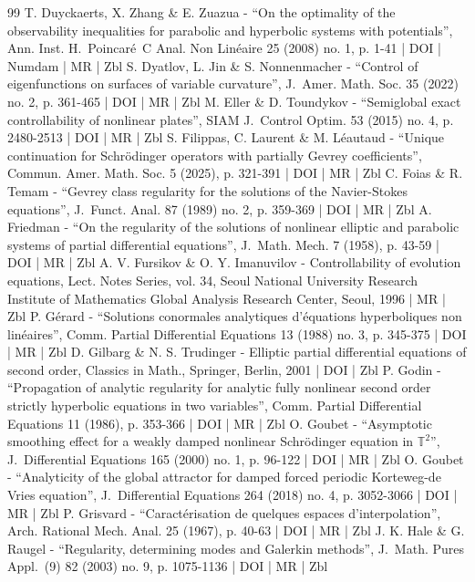 \documentclass[10pt]{amsart}
\theoremstyle{definition}
\begin{document}
\begin{thebibliography}{99}
T. Duyckaerts, X. Zhang \& E. Zuazua - “On the optimality of the observability inequalities for parabolic and hyperbolic systems with potentials”, Ann. Inst. H. Poincaré C Anal. Non Linéaire 25 (2008) no. 1, p. 1-41 | DOI | Numdam | MR | Zbl
S. Dyatlov, L. Jin \& S. Nonnenmacher - “Control of eigenfunctions on surfaces of variable curvature”, J. Amer. Math. Soc. 35 (2022) no. 2, p. 361-465 | DOI | MR | Zbl
M. Eller \& D. Toundykov - “Semiglobal exact controllability of nonlinear plates”, SIAM J. Control Optim. 53 (2015) no. 4, p. 2480-2513 | DOI | MR | Zbl
S. Filippas, C. Laurent \& M. Léautaud - “Unique continuation for Schrödinger operators with partially Gevrey coefficients”, Commun. Amer. Math. Soc. 5 (2025), p. 321-391 | DOI | MR | Zbl
C. Foias \& R. Temam - “Gevrey class regularity for the solutions of the Navier-Stokes equations”, J. Funct. Anal. 87 (1989) no. 2, p. 359-369 | DOI | MR | Zbl
A. Friedman - “On the regularity of the solutions of nonlinear elliptic and parabolic systems of partial differential equations”, J. Math. Mech. 7 (1958), p. 43-59 | DOI | MR | Zbl
A. V. Fursikov \& O. Y. Imanuvilov - Controllability of evolution equations, Lect. Notes Series, vol. 34, Seoul National University Research Institute of Mathematics Global Analysis Research Center, Seoul, 1996 | MR | Zbl
P. Gérard - “Solutions conormales analytiques d’équations hyperboliques non linéaires”, Comm. Partial Differential Equations 13 (1988) no. 3, p. 345-375 | DOI | MR | Zbl
D. Gilbarg \& N. S. Trudinger - Elliptic partial differential equations of second order, Classics in Math., Springer, Berlin, 2001 | DOI | Zbl
P. Godin - “Propagation of analytic regularity for analytic fully nonlinear second order strictly hyperbolic equations in two variables”, Comm. Partial Differential Equations 11 (1986), p. 353-366 | DOI | MR | Zbl
O. Goubet - “Asymptotic smoothing effect for a weakly damped nonlinear Schrödinger equation in $\mathbb{T}^2$”, J. Differential Equations 165 (2000) no. 1, p. 96-122 | DOI | MR | Zbl
O. Goubet - “Analyticity of the global attractor for damped forced periodic Korteweg-de Vries equation”, J. Differential Equations 264 (2018) no. 4, p. 3052-3066 | DOI | MR | Zbl
P. Grisvard - “Caractérisation de quelques espaces d’interpolation”, Arch. Rational Mech. Anal. 25 (1967), p. 40-63 | DOI | MR | Zbl
J. K. Hale \& G. Raugel - “Regularity, determining modes and Galerkin methods”, J. Math. Pures Appl. (9) 82 (2003) no. 9, p. 1075-1136 | DOI | MR | Zbl

\end{thebibliography}
\end{document}
